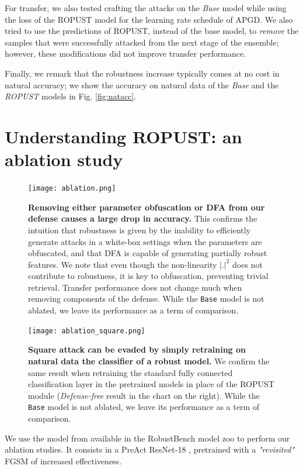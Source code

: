 \documentclass{article}
\begin{document}
For transfer, we also tested crafting the attacks on the \textit{Base} model while using the loss of the ROPUST model for the learning rate schedule of APGD. We also tried to use the predictions of ROPUST, instead of the base model, to \textit{remove} the samples that were successfully attacked from the next stage of the ensemble; however, these modifications did not improve transfer performance.

Finally, we remark that the robustness increase typically comes at no cost in natural accuracy; we show the accuracy on natural data of the \textit{Base} and the \textit{ROPUST} models in Fig. \ref{fig:natacc}.

\section{Understanding ROPUST: an ablation study}\label{sec:ablation}
\begin{figure}
    \centering
    \texttt{[image: ablation.png]}
    \caption{\textbf{Removing either parameter obfuscation or DFA from our defense causes a large drop in accuracy.} This confirms the intuition that robustness is given by the inability to efficiently generate attacks in a white-box settings when the parameters are obfuscated, and that DFA is capable of generating partially robust features. We note that even though the non-linearity $|.|^2$ does not contribute to robustness, it is key to obfuscation, preventing trivial retrieval. Transfer performance does not change much when removing components of the defense. While the \texttt{Base} model is not ablated, we leave its performance as a term of comparison.}
    \label{fig:ablation}
\end{figure}
\begin{figure}
    \centering
    \texttt{[image: ablation\_square.png]}
    \caption{\textbf{Square attack can be evaded by simply retraining on natural data the classifier of a robust model.} We confirm the same result when retraining the standard fully connected classification layer in the pretrained models in place of the ROPUST module (\textit{Defense-free} result in the chart on the right). While the \texttt{Base} model is not ablated, we leave its performance as a term of comparison.}
    \label{fig:ablation_square}
\end{figure}
We use the model from \cite{Wong2020FastIB} available in the RobustBench model zoo to perform our ablation studies. It consists in a PreAct ResNet-18 \cite{He2016IdentityMI}, pretrained with a \textit{"revisited"} FGSM of increased effectiveness.
\end{document}
